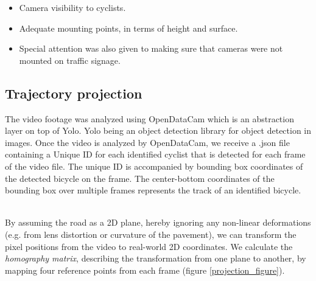 \documentclass[
10pt, %
a4paper, %
oneside, %
headinclude,footinclude, %
] {book}%
\begin{document}
\begin{itemize}
	\item Camera visibility to cyclists.
	\item Adequate mounting points, in terms of height and surface.
	\item Special attention was also given to making sure that cameras were not mounted on traffic signage.
\end{itemize}

\subsection{Trajectory projection}
The video footage was analyzed using OpenDataCam which is an abstraction layer on top of Yolo. Yolo being an object detection library for object detection in images.
Once the video is analyzed by OpenDataCam, we receive a .json file containing a Unique ID for each identified cyclist that is detected for each frame of the video file. 
The unique ID is accompanied by bounding box coordinates of the detected bicycle on the frame. 
The center-bottom coordinates of the bounding box over multiple frames represents the track of an identified bicycle.

\ \\
By assuming the road as a 2D plane, hereby ignoring any non-linear deformations (e.g. from lens distortion or curvature of the pavement), 
we can transform the pixel positions from the video to real-world 2D coordinates. 
We calculate the \textit{homography matrix}, describing the transformation from one plane to another, by mapping four reference points from each frame (figure \ref{projection_figure}).
\end{document}

